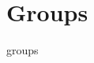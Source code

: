 \documentclass[class=report, crop=false]{standalone}
\begin{document}
\chapter{Groups}
{groups}
\end{document}
